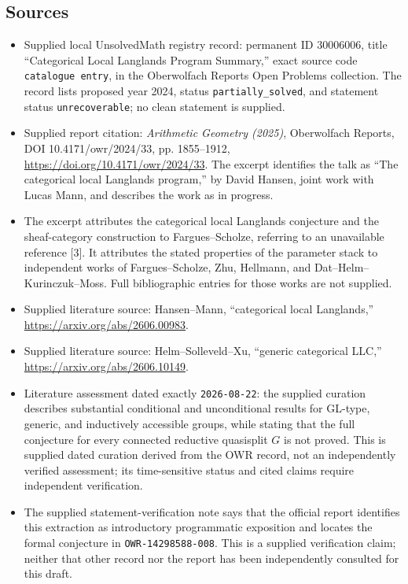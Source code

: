 \documentclass[11pt]{article}
\begin{document}
\subsection{Sources}
\begin{itemize}
\item Supplied local UnsolvedMath registry record: permanent ID \(30006006\), title ``Categorical Local Langlands Program Summary,'' exact source code \texttt{catalogue entry}, in the Oberwolfach Reports Open Problems collection. The record lists proposed year 2024, status \texttt{partially\_solved}, and statement status \texttt{unrecoverable}; no clean statement is supplied.
\item Supplied report citation: \emph{Arithmetic Geometry (2025)}, Oberwolfach Reports, DOI 10.4171/owr/2024/33, pp. 1855--1912, \url{https://doi.org/10.4171/owr/2024/33}. The excerpt identifies the talk as ``The categorical local Langlands program,'' by David Hansen, joint work with Lucas Mann, and describes the work as in progress.
\item The excerpt attributes the categorical local Langlands conjecture and the sheaf-category construction to Fargues--Scholze, referring to an unavailable reference [3]. It attributes the stated properties of the parameter stack to independent works of Fargues--Scholze, Zhu, Hellmann, and Dat--Helm--Kurinczuk--Moss. Full bibliographic entries for those works are not supplied.
\item Supplied literature source: Hansen--Mann, ``categorical local Langlands,'' \url{https://arxiv.org/abs/2606.00983}.
\item Supplied literature source: Helm--Solleveld--Xu, ``generic categorical LLC,'' \url{https://arxiv.org/abs/2606.10149}.
\item Literature assessment dated exactly \texttt{2026-08-22}: the supplied curation describes substantial conditional and unconditional results for GL-type, generic, and inductively accessible groups, while stating that the full conjecture for every connected reductive quasisplit \(G\) is not proved. This is supplied dated curation derived from the OWR record, not an independently verified assessment; its time-sensitive status and cited claims require independent verification.
\item The supplied statement-verification note says that the official report identifies this extraction as introductory programmatic exposition and locates the formal conjecture in \texttt{OWR-14298588-008}. This is a supplied verification claim; neither that other record nor the report has been independently consulted for this draft.
\end{itemize}
\end{document}
